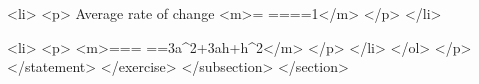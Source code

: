                         <li>
                            <p>
                                Average rate of change <m>= ====1</m>
                            </p>
                        </li>

                        <li>
                            <p>
                                <m>=== ==3a^{2}+3ah+h^{2}</m>
                            </p>
                        </li>
                    </ol>
                </p>
            </statement>
        </exercise>
    </subsection>
</section>